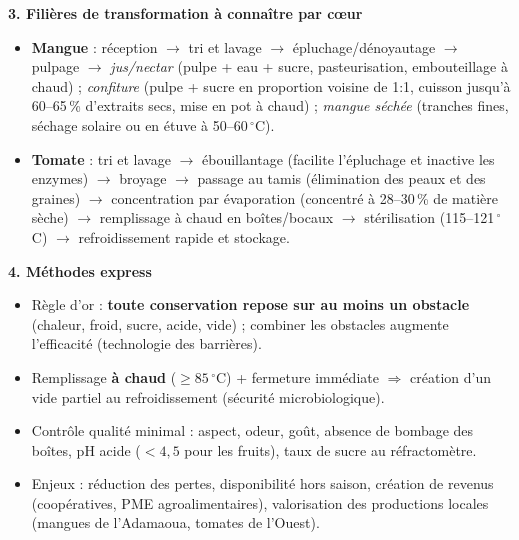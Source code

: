 \documentclass[11pt]{article}
\begin{document}
\begin{aretenir}
\textbf{3. Filières de transformation à connaître par c\oe ur}
\begin{itemize}
  \item \textbf{Mangue} : réception $\to$ tri et lavage $\to$ épluchage/dénoyautage $\to$ pulpage $\to$ \emph{jus/nectar} (pulpe + eau + sucre, pasteurisation, embouteillage à chaud) ; \emph{confiture} (pulpe + sucre en proportion voisine de 1:1, cuisson jusqu'à 60--65\,\% d'extraits secs, mise en pot à chaud) ; \emph{mangue séchée} (tranches fines, séchage solaire ou en étuve à 50--60\,$^\circ$C).
  \item \textbf{Tomate} : tri et lavage $\to$ ébouillantage (facilite l'épluchage et inactive les enzymes) $\to$ broyage $\to$ passage au tamis (élimination des peaux et des graines) $\to$ concentration par évaporation (concentré à 28--30\,\% de matière sèche) $\to$ remplissage à chaud en boîtes/bocaux $\to$ stérilisation (115--121\,$^\circ$C) $\to$ refroidissement rapide et stockage.
\end{itemize}

\textbf{4. Méthodes express}
\begin{itemize}
  \item Règle d'or : \textbf{toute conservation repose sur au moins un obstacle} (chaleur, froid, sucre, acide, vide) ; combiner les obstacles augmente l'efficacité (technologie des barrières).
  \item Remplissage \textbf{à chaud} ($\geq 85\,^\circ$C) + fermeture immédiate $\Rightarrow$ création d'un vide partiel au refroidissement (sécurité microbiologique).
  \item Contrôle qualité minimal : aspect, odeur, goût, absence de bombage des boîtes, pH acide ($< 4{,}5$ pour les fruits), taux de sucre au réfractomètre.
  \item Enjeux : réduction des pertes, disponibilité hors saison, création de revenus (coopératives, PME agroalimentaires), valorisation des productions locales (mangues de l'Adamaoua, tomates de l'Ouest).
\end{itemize}
\end{aretenir}
\end{document}
